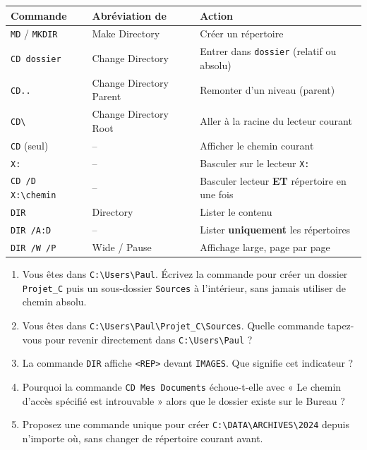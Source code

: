 \documentclass[11pt]{article}
\begin{document}
\begin{aretenir}
\begin{center}
\begin{tabularx}{\linewidth}{|l|l|X|}\hline
\rowcolor{popblueL}
\textbf{Commande} & \textbf{Abréviation de} & \textbf{Action} \\\hline
\texttt{MD} / \texttt{MKDIR} & Make Directory & Créer un répertoire \\\hline
\texttt{CD dossier} & Change Directory & Entrer dans \texttt{dossier} (relatif ou absolu) \\\hline
\texttt{CD..} & Change Directory Parent & Remonter d'un niveau (parent) \\\hline
\texttt{CD\textbackslash} & Change Directory Root & Aller à la racine du lecteur courant \\\hline
\texttt{CD} (seul) & -- & Afficher le chemin courant \\\hline
\texttt{X:} & -- & Basculer sur le lecteur \texttt{X:} \\\hline
\texttt{CD /D X:\textbackslash chemin} & -- & Basculer lecteur \textbf{ET} répertoire en une fois \\\hline
\texttt{DIR} & Directory & Lister le contenu \\\hline
\texttt{DIR /A:D} & -- & Lister \textbf{uniquement} les répertoires \\\hline
\texttt{DIR /W /P} & Wide / Pause & Affichage large, page par page \\\hline
\end{tabularx}
\end{center}
\end{aretenir}

\begin{exercice}
\begin{enumerate}
    \item Vous êtes dans \texttt{C:\textbackslash Users\textbackslash Paul}. Écrivez la commande pour créer un dossier \texttt{Projet\_C} puis un sous-dossier \texttt{Sources} à l'intérieur, sans jamais utiliser de chemin absolu.
    \item Vous êtes dans \texttt{C:\textbackslash Users\textbackslash Paul\textbackslash Projet\_C\textbackslash Sources}. Quelle commande tapez-vous pour revenir directement dans \texttt{C:\textbackslash Users\textbackslash Paul} ?
    \item La commande \texttt{DIR} affiche \texttt{<REP>} devant \texttt{IMAGES}. Que signifie cet indicateur ?
    \item Pourquoi la commande \texttt{CD Mes Documents} échoue-t-elle avec « Le chemin d'accès spécifié est introuvable » alors que le dossier existe sur le Bureau ?
    \item Proposez une commande unique pour créer \texttt{C:\textbackslash DATA\textbackslash ARCHIVES\textbackslash 2024} depuis n'importe où, sans changer de répertoire courant avant.
\end{enumerate}
\end{exercice}
\end{document}
